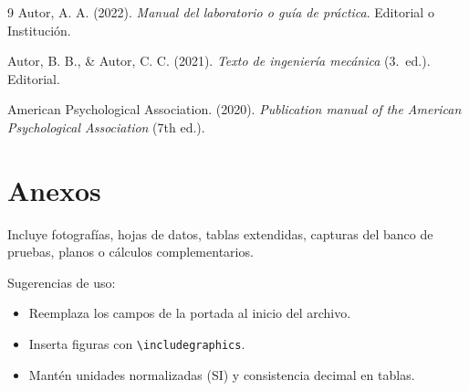 \documentclass[12pt,a4paper]{article}
\begin{document}
\begin{thebibliography}{9}
  Autor, A. A. (2022). \textit{Manual del laboratorio o gu\'ia de pr\'actica}. Editorial o Instituci\'on.

  Autor, B. B., \& Autor, C. C. (2021). \textit{Texto de ingenier\'ia mec\'anica} (3.\textordfeminine~ed.). Editorial.

  American Psychological Association. (2020). \textit{Publication manual of the American Psychological Association} (7th ed.).
\end{thebibliography}

\section{Anexos}
Incluye fotograf\'ias, hojas de datos, tablas extendidas, capturas del banco de pruebas, planos o c\'alculos complementarios.

\begin{infobox}[colback=white,colframe=UNILine]
Sugerencias de uso:
\begin{itemize}[leftmargin=1.5em]
  \item Reemplaza los campos de la portada al inicio del archivo.
  \item Inserta figuras con \texttt{\textbackslash includegraphics}.
  \item Mant\'en unidades normalizadas (SI) y consistencia decimal en tablas.
\end{itemize}
\end{infobox}
\end{document}
